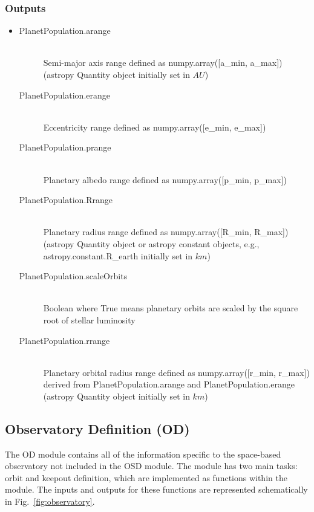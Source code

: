 \documentclass[cleanfoot]{asme2ej}
\begin{document}
\subsubsection*{Outputs}
\begin{itemize}
    \item
    \begin{description}
        \item[PlanetPopulation.arange] \hfill \\
        Semi-major axis range defined as numpy.array([a\_min, a\_max]) (astropy Quantity object initially set in $ AU $)
        \item[PlanetPopulation.erange] \hfill \\
        Eccentricity range defined as numpy.array([e\_min, e\_max])
        \item[PlanetPopulation.prange] \hfill \\
        Planetary albedo range defined as numpy.array([p\_min, p\_max])
        \item[PlanetPopulation.Rrange] \hfill \\
        Planetary radius range defined as numpy.array([R\_min, R\_max]) (astropy Quantity object or astropy constant objects, e.g., astropy.constant.R\_earth initially set in $ km $)
        \item[PlanetPopulation.scaleOrbits] \hfill \\
        Boolean where True means planetary orbits are scaled by the square root of stellar luminosity
        \item[PlanetPopulation.rrange] \hfill \\
        Planetary orbital radius range defined as numpy.array([r\_min, r\_max]) derived from PlanetPopulation.arange and PlanetPopulation.erange (astropy Quantity object initially set in $ km $)
    \end{description}
\end{itemize}


\subsection{Observatory Definition (OD)}
The OD module contains all of the information specific to the space-based observatory not included in the OSD module. The module has two main tasks: orbit and keepout definition, which are implemented as functions within the module. The inputs and outputs for these functions are represented schematically in Fig.~\ref{fig:observatory}.
\end{document}
